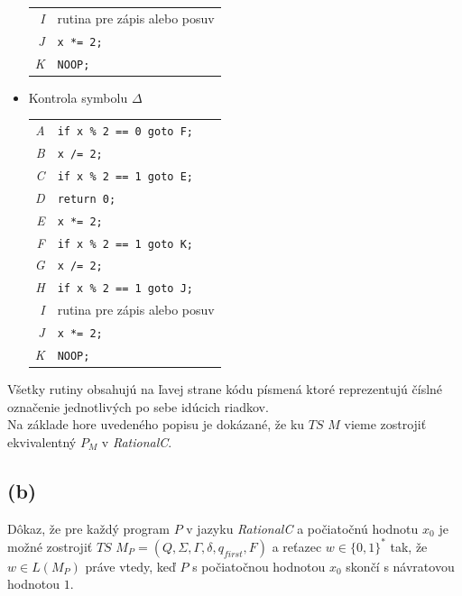 \documentclass[11pt,a4paper]{article}
\begin{document}
\begin{itemize}
\begin{flushright}
\begin{minipage}{0.90\textwidth}
\begin{tabular}{r|l}
                \textit{I} & rutina pre zápis alebo posuv\\
                \textit{J} & \texttt{x *= 2;}\\
                \textit{K} & \texttt{NOOP;}
            \end{tabular}
        \end{minipage}
        \end{flushright}
    \item Kontrola symbolu $\Delta$
        \begin{flushright}
        \begin{minipage}{0.90\textwidth}
            \begin{tabular}{r|l}
                \textit{A} & \texttt{if x \% 2 == 0 goto F;}\\
                \textit{B} & \texttt{x /= 2;}\\
                \textit{C} & \texttt{if x \% 2 == 1 goto E;}\\
                \textit{D} & \texttt{return 0;}\\
                \textit{E} & \texttt{x *= 2;}\\
                \textit{F} & \texttt{if x \% 2 == 1 goto K;}\\
                \textit{G} & \texttt{x /= 2;}\\
                \textit{H} & \texttt{if x \% 2 == 1 goto J;}\\
                \textit{I} & rutina pre zápis alebo posuv\\
                \textit{J} & \texttt{x *= 2;}\\
                \textit{K} & \texttt{NOOP;}
            \end{tabular}
        \end{minipage}
        \end{flushright}
\end{itemize}

Všetky rutiny obsahujú na ľavej strane kódu písmená ktoré reprezentujú číslné označenie jednotlivých po sebe idúcich riadkov.\\

Na základe hore uvedeného popisu je dokázané, že ku $TS$ $M$ vieme zostrojiť ekvivalentný $P_M$ v \textit{RationalC}.

\newpage
\subsection{(b)}
Dôkaz, že pre každý program $P$ v jazyku \textit{RationalC} a počiatočnú hodnotu $x_0$ je možné zostrojiť $TS$ $M_P = (Q, \Sigma, \Gamma, \delta, q_{first}, F)$ a reťazec $w \in \{0,1\}^*$ tak, že $w \in L(M_P)$ práve vtedy, keď $P$ s počiatočnou hodnotou $x_0$ skončí s návratovou hodnotou $1$.\\
\end{document}
